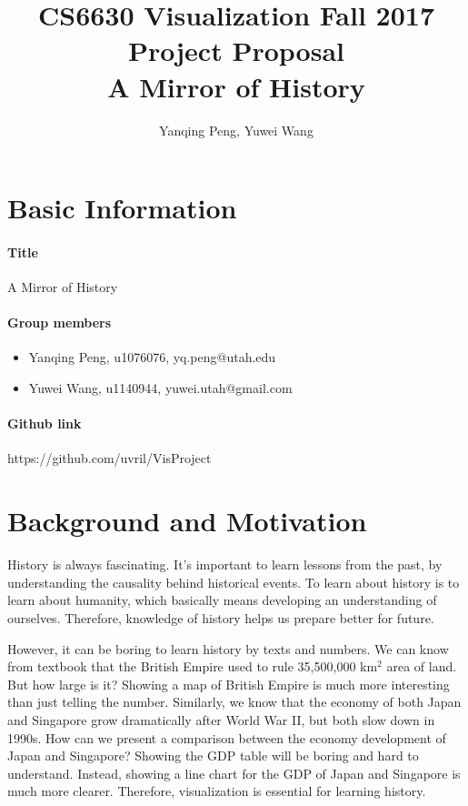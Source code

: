 \documentclass[12pt, fullpage,letterpaper]{article}
\title{CS6630 Visualization Fall 2017 Project Proposal\\ A Mirror of History}
\author{Yanqing Peng, Yuwei Wang}
\begin{document}
\maketitle

\section{Basic Information}
\paragraph{Title} A Mirror of History
\paragraph{Group members}
\begin{itemize}
    \item Yanqing Peng, u1076076, yq.peng@utah.edu
    \item Yuwei Wang, u1140944, yuwei.utah@gmail.com
\end{itemize}
\paragraph{Github link} https://github.com/uvril/VisProject

\section{Background and Motivation}

History is always fascinating.  It's important to learn lessons from the past,
by understanding the causality behind historical events.  To learn about
history is to learn about humanity, which basically means developing an
understanding of ourselves.  Therefore, knowledge of history helps us prepare
better for future.

However, it can be boring to learn history by texts and numbers. We can know
from textbook that the British Empire used to rule 35,500,000 km$^2$ area of
land. But how large is it?  Showing a map of British Empire is much more
interesting than just telling the number.  Similarly, we know that the economy
of both Japan and Singapore grow dramatically after World War II, but both slow
down in 1990s.  How can we present a comparison between the economy development
of Japan and Singapore?  Showing the GDP table will be boring and hard to
understand.  Instead, showing a line chart for the GDP of Japan and Singapore
is much more clearer. Therefore, visualization is essential for learning history.
\end{document}
